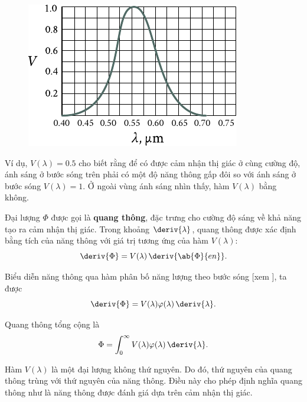\begin{figure}[!htb]
	\begin{center}
		\includegraphics[scale=1]{figures/ch_16/fig_16_3.pdf}
		\caption[]{}
		\label{fig:16_3}
	\end{center}
	\vspace{-0.8cm}
\end{figure}

\noindent
Ví dụ, $V(\lambda) = 0.5$ cho biết rằng để có được cảm nhận thị giác ở cùng cường độ, ánh sáng ở bước sóng trên phải có một độ năng thông gấp đôi so với ánh sáng ở bước sóng $V(\lambda)=1$.
Ở ngoài vùng ánh sáng nhìn thấy, hàm $V(\lambda)$ bằng không.

Đại lượng $\Phi$ được gọi là \textbf{quang thông}, đặc trưng cho cường độ sáng về khả năng tạo ra cảm nhận thị giác.
Trong khoảng $\deriv{\lambda}$, quang thông được xác định bằng tích của năng thông với giá trị tương ứng của hàm $V(\lambda)$:
\begin{equation}\label{eq:16_37}
    \deriv{\Phi} = V(\lambda)\, \deriv{\ab{\Phi}{en}}.
\end{equation}

\noindent
Biểu diễn năng thông qua hàm phân bố năng lượng theo bước sóng [xem ], ta được
\begin{equation}\label{eq:16_38}
    \deriv{\Phi} = V(\lambda) \varphi(\lambda)\, \deriv{\lambda}.
\end{equation}

\noindent
Quang thông tổng cộng là
\begin{equation}\label{eq:16_39}
    \Phi = \int_0^{\infty} V(\lambda) \varphi(\lambda)\, \deriv{\lambda}.
\end{equation}

Hàm $V(\lambda)$ là một đại lượng không thứ nguyên.
Do đó, thứ nguyên của quang thông trùng với thứ nguyên của năng thông.
Điều này cho phép định nghĩa quang thông như là năng thông được đánh giá dựa trên cảm nhận thị giác.

